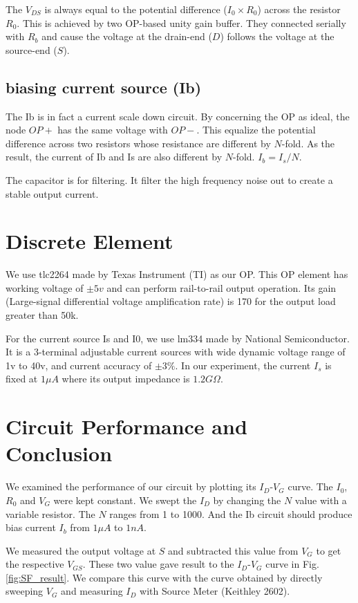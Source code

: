 The $V_{DS}$ is always equal to the potential difference ($I_0 \times R_0$) across the resistor $R_0$.
This is achieved by two OP-based unity gain buffer.
They connected serially with $R_b$ and cause the voltage at the drain-end ($D$) follows the voltage at the source-end ($S$).


\subsection*{biasing current source (Ib)}
The Ib is in fact a current scale down circuit.
By concerning the OP as ideal, the node $OP+$ has the same voltage with $OP-$.
This equalize the potential difference across two resistors whose resistance are different by $N$-fold.
As the result, the current of Ib and Is are also different by $N$-fold.
$I_b = I_s / N$.

The capacitor is for filtering. It filter the high frequency noise out to create a stable output current.


\section{Discrete Element}
We use tlc2264 made by Texas Instrument (TI) as our OP.
This OP element has working voltage of $\pm 5v$ and can perform rail-to-rail output operation.
Its gain (Large-signal differential voltage amplification rate) is 170 for the output load greater than 50k.

For the current source Is and I0, we use lm334 made by National Semiconductor.
It is a 3-terminal adjustable current sources with wide dynamic voltage range of 1v to 40v, and current accuracy of $\pm 3\%$.
In our experiment, the current $I_s$ is fixed at $1\mu A$ where its output impedance is $1.2G\Omega$.

\section{Circuit Performance and Conclusion}
We examined the performance of our circuit by plotting its $I_D$-$V_G$ curve.
The $I_0$, $R_0$ and $V_G$ were kept constant.
We swept the $I_D$ by changing the $N$ value with a variable resistor.
The $N$ ranges from 1 to 1000.
And the Ib circuit should produce bias current $I_b$ from $1\mu A$ to $1n A$.

We measured the output voltage at $S$ and subtracted this value from $V_G$ to get the respective $V_{GS}$.
These two value gave result to the $I_D$-$V_G$ curve in Fig.\ref{fig:SF_result}.
We compare this curve with the curve obtained by directly sweeping $V_G$ and measuring $I_D$ with Source Meter (Keithley 2602).

